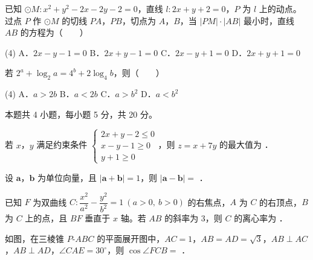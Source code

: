 \begin{question}
已知 $\odot M:x^{2}+y^{2}-2x-2y-2=0$，直线 $l:2x+y+2=0$，$P$ 为 $l$ 上的动点。过点 $P$ 作 $\odot M$ 的切线 $PA$，$PB$，切点为 $A$，$B$，当 $|PM|\cdot|AB|$ 最小时，直线 $AB$ 的方程为（　　）

\begin{gkopts}(4)
\task A．$2x-y-1=0$
\task B．$2x+y-1=0$
\task C．$2x-y+1=0$
\task D．$2x+y+1=0$
\end{gkopts}

\end{question}
\begin{question}
若 $2^{a}+\log_2 a=4^{b}+2\log_4 b$，则（　　）

\begin{gkopts}(4)
\task A．$a>2b$
\task B．$a<2b$
\task C．$a>b^{2}$
\task D．$a<b^{2}$
\end{gkopts}

\par\medskip

\end{question}

\begin{gktip}
本题共 4 小题，每小题 5 分，共 20 分。
\end{gktip}

\begin{question}
若 $x$，$y$ 满足约束条件 $\begin{cases}2x+y-2\le0\\ x-y-1\ge0\\ y+1\ge0\end{cases}$，则 $z=x+7y$ 的最大值为 \gkblank{}．

\end{question}
\begin{question}
设 $\boldsymbol a$，$\boldsymbol b$ 为单位向量，且 $|\boldsymbol a+\boldsymbol b|=1$，则 $|\boldsymbol a-\boldsymbol b|=$ \gkblank{}．

\end{question}
\begin{question}
已知 $F$ 为双曲线 $C:\dfrac{x^{2}}{a^{2}}-\dfrac{y^{2}}{b^{2}}=1\ (a>0,\ b>0)$ 的右焦点，$A$ 为 $C$ 的右顶点，$B$ 为 $C$ 上的点，且 $BF$ 垂直于 $x$ 轴。若 $AB$ 的斜率为 $3$，则 $C$ 的离心率为 \gkblank{}．

\Needspace{0.4\textheight}
\end{question}
\begin{question}
如图，在三棱锥 $P\text{-}ABC$ 的平面展开图中，$AC=1$，$AB=AD=\sqrt3$，$AB\perp AC$，$AB\perp AD$，$\angle CAE=30^\circ$，则 $\cos\angle FCB=$ \gkblank{}．
\nopagebreak[4]
\begin{center}\end{center}
\nopagebreak[4]
\par\medskip

\end{question}

